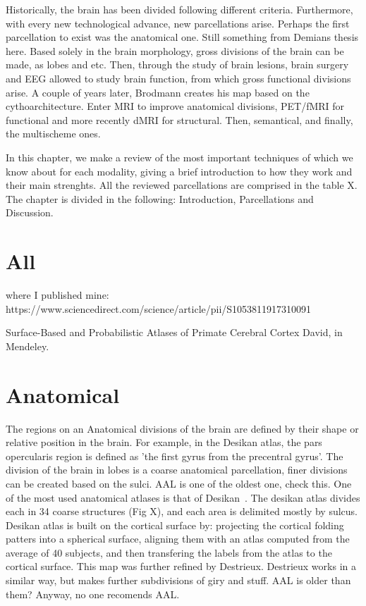 Historically, the brain has been divided following different criteria. Furthermore,
with every new technological advance, new parcellations arise. Perhaps the first
parcellation to exist was the anatomical one. Still something from Demians thesis
here. Based solely in the brain morphology, gross divisions of the brain can be
made, as lobes and etc. Then, through the study of brain lesions, brain surgery
and EEG allowed to study brain function, from which gross functional divisions
arise. A couple of years later, Brodmann creates his map based on the
cythoarchitecture. Enter MRI to improve anatomical divisions, PET/fMRI for functional
and more recently dMRI for structural. Then, semantical, and finally, the
multischeme ones.

In this chapter, we make a review of the most important techniques of which
we know about for each modality, giving a brief introduction to how they work
and their main strenghts. All the reviewed parcellations are comprised in the
table X. The chapter is divided in the following: Introduction, Parcellations
and Discussion.

\section{All}
where I published mine:
https://www.sciencedirect.com/science/article/pii/S1053811917310091

Surface-Based and Probabilistic Atlases of Primate Cerebral Cortex
David, in Mendeley.

\section{Anatomical}
The regions on an Anatomical divisions of the brain are defined by their shape
or relative position in the brain. For example, in the Desikan atlas, the
pars opercularis region is defined as 'the first gyrus from the precentral gyrus'.
The division of the brain in lobes is a coarse anatomical parcellation, finer
divisions can be created based on the sulci. AAL is one of the oldest one,
check this. One of the most used anatomical atlases is that of Desikan~\cite{Desikan2006}.
The desikan atlas divides each in 34 coarse structures (Fig X), and each
area is delimited mostly by sulcus. Desikan atlas is built on the cortical surface by: projecting the cortical folding
patters into a spherical surface, aligning them with an atlas computed from the
average of 40 subjects, and then transfering the labels from the atlas to the
cortical surface.
This map was further refined by Destrieux. Destrieux works in a similar way,
but makes further subdivisions of giry and stuff. AAL is older than them?
Anyway, no one recomends AAL.

